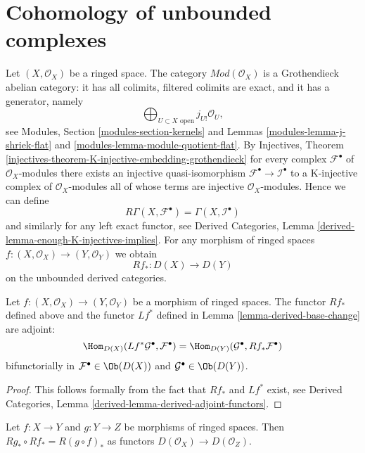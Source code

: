 \section{Cohomology of unbounded complexes}
\label{section-unbounded}

\noindent
Let $(X, \mathcal{O}_X)$ be a ringed space.
The category $\textit{Mod}(\mathcal{O}_X)$ is a Grothendieck
abelian category: it has all colimits,
filtered colimits are exact, and it has a generator, namely
$$
\bigoplus\nolimits_{U \subset X\text{ open}} j_{U!}\mathcal{O}_U,
$$
see Modules, Section \ref{modules-section-kernels} and
Lemmas \ref{modules-lemma-j-shriek-flat} and
\ref{modules-lemma-module-quotient-flat}.
By
Injectives, Theorem
\ref{injectives-theorem-K-injective-embedding-grothendieck}
for every complex $\mathcal{F}^\bullet$ of $\mathcal{O}_X$-modules
there exists an injective quasi-isomorphism
$\mathcal{F}^\bullet \to \mathcal{I}^\bullet$ to a K-injective complex
of $\mathcal{O}_X$-modules all of whose terms are injective
$\mathcal{O}_X$-modules. Hence we can define
$$
R\Gamma(X, \mathcal{F}^\bullet) = \Gamma(X, \mathcal{I}^\bullet)
$$
and similarly for any left exact functor, see
Derived Categories, Lemma \ref{derived-lemma-enough-K-injectives-implies}.
For any morphism of
ringed spaces $f : (X, \mathcal{O}_X) \to (Y, \mathcal{O}_Y)$ we obtain
$$
Rf_* : D(X) \longrightarrow D(Y)
$$
on the unbounded derived categories.

\begin{lemma}
\label{lemma-adjoint}
Let $f : (X, \mathcal{O}_X) \to (Y, \mathcal{O}_Y)$ be a morphism of
ringed spaces. The functor $Rf_*$ defined above and the functor $Lf^*$
defined in Lemma \ref{lemma-derived-base-change} are adjoint:
$$
\Hom_{D(X)}(Lf^*\mathcal{G}^\bullet, \mathcal{F}^\bullet)
=
\Hom_{D(Y)}(\mathcal{G}^\bullet, Rf_*\mathcal{F}^\bullet)
$$
bifunctorially in $\mathcal{F}^\bullet \in \Ob(D(X))$ and
$\mathcal{G}^\bullet \in \Ob(D(Y))$.
\end{lemma}

\begin{proof}
This follows formally from the fact that $Rf_*$ and $Lf^*$ exist, see
Derived Categories, Lemma \ref{derived-lemma-derived-adjoint-functors}.
\end{proof}

\begin{lemma}
\label{lemma-derived-pushforward-composition}
Let $f : X \to Y$ and $g : Y \to Z$ be morphisms of ringed spaces.
Then $Rg_* \circ Rf_* = R(g \circ f)_*$ as functors
$D(\mathcal{O}_X) \to D(\mathcal{O}_Z)$.
\end{lemma}

